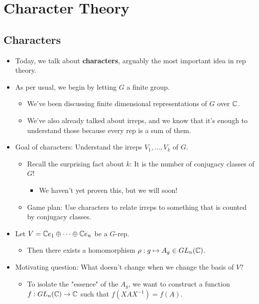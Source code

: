 \documentclass[../notes.tex]{subfiles}
\begin{document}
\chapter{Character Theory}
\section{Characters}
\begin{itemize}
    \item {}Today, we talk about \textbf{characters}, arguably the most important idea in rep theory.
    \item As per usual, we begin by letting $G$ a finite group.
    \begin{itemize}
        \item We've been discussing finite dimensional representations of $G$ over $\mathbb{C}$.
        \item We've also already talked about irreps, and we know that it's enough to understand those because every rep is a sum of them.
    \end{itemize}
    \item Goal of characters: Understand the irreps $V_1,\dots,V_k$ of $G$.
    \begin{itemize}
        \item Recall the surprising fact about $k$: It is the number of conjugacy classes of $G$!
        \begin{itemize}
            \item We haven't yet proven this, but we will soon!
        \end{itemize}
        \item Game plan: Use characters to relate irreps to something that is counted by conjugacy classes.
    \end{itemize}
    \item Let $V=\mathbb{C} e_1\oplus\cdots\oplus\mathbb{C} e_n$ be a $G$-rep.
    \begin{itemize}
        \item Then there exists a homomorphism $\rho:g\mapsto A_g\in GL_n(\mathbb{C})$.
    \end{itemize}
    \item Motivating question: What doesn't change when we change the basis of $V$?
    \begin{itemize}
        \item To isolate the "essence" of the $A_g$, we want to construct a function $f:GL_n(\mathbb{C})\to\mathbb{C}$ such that $f(XAX^{-1})=f(A)$.
    \end{itemize}

\end{itemize}
\end{document}
